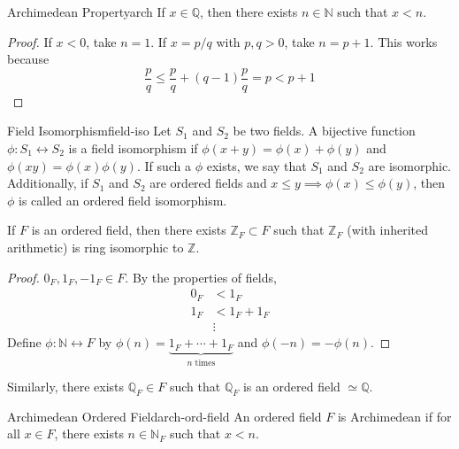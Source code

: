 \documentclass[10pt]{report}
\begin{document}
\begin{defn}{Archimedean Property}{arch}
	If $x \in \mathbb{Q}$, then there exists  $n \in \mathbb{N}$ such that $x < n$.
\end{defn}
\begin{proof}
	If $x < 0$, take $n=1$. If $x = p/q$ with $p,q > 0$, take $n = p+1$. This works because
	\[
		\frac{p}{q} \leq \frac{p}{q} + (q-1) \frac{p}{q} = p < p+1
	\] 
\end{proof}

\begin{defn}{Field Isomorphism}{field-iso}
	Let $S_1$ and $S_2$ be two fields. A bijective function $\phi: S_1 \leftrightarrow S_2$ is a field isomorphism if $\phi(x+y) = \phi(x)+\phi(y)$ and $\phi(xy) = \phi(x) \phi(y)$. If such a $ \phi$ exists, we say that $S_1$ and $S_2$ are isomorphic.
	Additionally, if $S_1$ and $S_2$ are ordered fields and $x \leq y \implies \phi(x) \leq \phi(y)$, then $\phi$ is called an ordered field isomorphism.
\end{defn}

\begin{prop}
	If $F$ is an ordered field, then there exists  $\mathbb{Z}_F \subset F$ such that $\mathbb{Z}_F$ (with inherited arithmetic) is ring isomorphic to $\mathbb{Z}$.
\end{prop}
\begin{proof}
	$0_F, 1_F, -1_F \in F$. By the properties of fields, 
	\begin{align*}
		0_F &< 1_F \\
		1_F &< 1_F + 1_F \\
		    &\vdots
	\end{align*}
	Define $\phi: \mathbb{N} \leftrightarrow F$ by $\phi(n) = \underbrace{1_F + \cdots + 1_F}_{n \text{ times}}$ and $\phi(-n) = -\phi(n)$.
\end{proof}

\begin{prop}
	Similarly, there exists $\mathbb{Q}_F \in F$ such that $\mathbb{Q}_F$ is an ordered field $\simeq \mathbb{Q}$.
\end{prop}

\begin{defn}{Archimedean Ordered Field}{arch-ord-field}
	An ordered field $F$ is Archimedean if for all $x \in F$, there exists $n \in \mathbb{N}_F$ such that $x<n$.
\end{defn}
\end{document}
